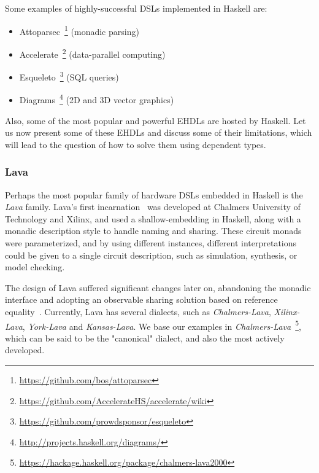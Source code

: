             Some examples of highly-successful \acp{DSL} implemented in Haskell are:

            \begin{itemize}
                \item Attoparsec~\footnote{\url{https://github.com/bos/attoparsec}} (monadic parsing)
                \item Accelerate~\footnote{\url{https://github.com/AccelerateHS/accelerate/wiki}} (data-parallel computing)
                \item Esqueleto~\footnote{\url{https://github.com/prowdsponsor/esqueleto}} (SQL queries)
                \item Diagrams~\footnote{\url{http://projects.haskell.org/diagrams/}} (2D and 3D vector graphics)
            \end{itemize}

            Also, some of the most popular and powerful \acp{EHDL} are hosted by Haskell.
            Let us now present some of these \acp{EHDL} and discuss some of their limitations,
            which will lead to the question of how to solve them using dependent types.

            \subsubsection{Lava}
            Perhaps the most popular family of hardware \acp{DSL} embedded in Haskell is the \emph{Lava} family.
            Lava's first incarnation~\cite{lava-1999} was developed at Chalmers University of Technology
            and Xilinx, and used a shallow-embedding in Haskell, along with a monadic description style
            to handle naming and sharing.
            These circuit monads were parameterized, and by using different instances,
            different interpretations could be given to a single circuit description, such as
            simulation, synthesis, or model checking.

            The design of Lava suffered significant changes later on, abandoning the monadic interface
            and adopting an observable sharing solution based on reference equality~\cite{observable-sharing-circuits}.
            Currently, Lava has several dialects, such as \emph{Chalmers-Lava}, \emph{Xilinx-Lava}, \emph{York-Lava} and \emph{Kansas-Lava}.
            We base our examples in \emph{Chalmers-Lava}~\footnote{\url{https://hackage.haskell.org/package/chalmers-lava2000}},
            which can be said to be the "canonical" dialect, and also the most actively developed.

